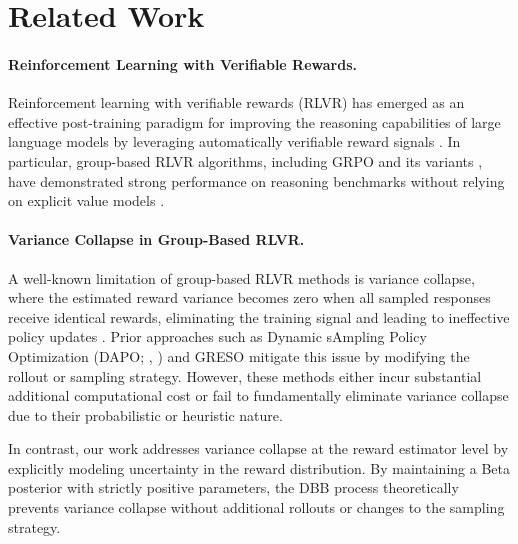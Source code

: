 \section{Related Work}

\paragraph{Reinforcement Learning with Verifiable Rewards.}
Reinforcement learning with verifiable rewards (RLVR) has emerged as an effective post-training paradigm for improving the reasoning capabilities of large language models by leveraging automatically verifiable reward signals \cite{lambert2025tulu3pushingfrontiers, plaat}. 
In particular, group-based RLVR algorithms, including GRPO and its variants \cite{shao2024deepseekmath, yu2025dapoopensourcellmreinforcement, liu2025understandingr1zeroliketrainingcritical, zheng2025groupsequencepolicyoptimization, zhao2025geometricmeanpolicyoptimization}, have demonstrated strong performance on reasoning benchmarks without relying on explicit value models \cite{yu2025rlprextrapolatingrlvrgeneral}.

\paragraph{Variance Collapse in Group-Based RLVR.}
A well-known limitation of group-based RLVR methods is variance collapse, where the estimated reward variance becomes zero when all sampled responses receive identical rewards, eliminating the training signal and leading to ineffective policy updates \cite{yu2025dapoopensourcellmreinforcement, zheng2025actpaysefficientreinforcement, le2025promptleftbehindexploiting, zhang2025improving}. 
Prior approaches such as Dynamic sAmpling Policy Optimization (DAPO; \citeauthor{yu2025dapoopensourcellmreinforcement}, \citeyear{yu2025dapoopensourcellmreinforcement}) and GRESO \cite{zheng2025actpaysefficientreinforcement} mitigate this issue by modifying the rollout or sampling strategy. 
However, these methods either incur substantial additional computational cost or fail to fundamentally eliminate variance collapse due to their probabilistic or heuristic nature.

In contrast, our work addresses variance collapse at the reward estimator level by explicitly modeling uncertainty in the reward distribution. 
By maintaining a Beta posterior with strictly positive parameters, the DBB process theoretically prevents variance collapse without additional rollouts or changes to the sampling strategy.

